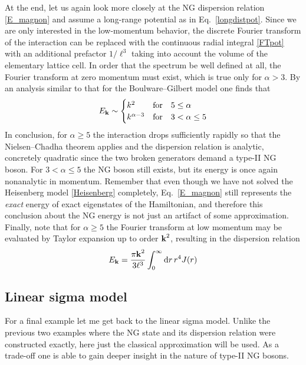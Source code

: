 \documentclass[final,2p,times,12pt,sort&compress]{elsarticle}
\newcommand\vek[1]{{\boldsymbol{\bf #1}}}   %
\newcommand\dd{\mathop{{\rm d}\!}\nolimits} %
\begin{document}
At the end, let us again look more closely at the NG dispersion relation
\eqref{E_magnon} and assume a long-range potential as in
Eq.~\eqref{longdistpot}. Since we are only interested in the low-momentum
behavior, the discrete Fourier transform of the interaction can be replaced
with the continuous radial integral \eqref{FTpot} with an additional prefactor
$1/\ell^3$ taking into account the volume of the elementary lattice cell. In
order that the spectrum be well defined at all, the Fourier transform at zero
momentum must exist, which is true only for $\alpha>3$. By an analysis similar
to that for the Boulware--Gilbert model one finds that
\begin{equation}
E_{\vek k}\sim
\begin{cases}
k^2 & \text{for}\quad5\leq\alpha\\
k^{\alpha-3} & \text{for}\quad3<\alpha\leq 5
\end{cases}
\end{equation}
In conclusion, for $\alpha\geq5$ the interaction drops sufficiently rapidly so
that the Nielsen--Chadha theorem applies and the dispersion relation is
analytic, concretely quadratic since the two broken generators demand a
type-II NG boson. For $3<\alpha\leq5$ the NG boson still exists, but its energy
is once again nonanalytic in momentum. Remember that even though we have not
solved the Heisenberg model \eqref{Heisenberg} completely, Eq.~\eqref{E_magnon}
still represents the \emph{exact} energy of exact eigenstates of the
Hamiltonian, and therefore this conclusion about the NG energy is not just an
artifact of some approximation. Finally, note that for $\alpha\geq5$ the
Fourier transform at low momentum may be evaluated by Taylor expansion up to
order $\vek k^2$, resulting in the dispersion relation
\begin{equation}
E_{\vek k}=\frac{\pi\vek k^2}{3\ell^3}\int_0^\infty\dd r\,r^4J(r)
\end{equation}


\subsection{Linear sigma model}
For a final example let me get back to the linear sigma model. Unlike the
previous two examples where the NG state and its dispersion relation were
constructed exactly, here just the classical approximation will be
used. As a trade-off one is able to gain deeper insight in the nature of type-II
NG bosons.
\end{document}
